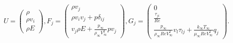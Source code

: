 \documentclass[a4paper,11pt,UTF8]{article}%
\theoremstyle{plain}
\begin{document}
$$U=\begin{pmatrix}
	\rho\\
	\rho v_i\\
	\rho E
\end{pmatrix},
F_j=\begin{pmatrix}
	\rho v_j\\
	\rho v_iv_j+p\delta_{ij}\\
	v_j\rho E+\frac{p_{\infty}}{\rho_{\infty}V_{\infty}^2}pv_j
\end{pmatrix},
G_j=\begin{pmatrix}
	0\\
	\frac{\tau_{ji}}{Re}\\
	\frac{p_{\infty}}{\rho_{\infty}ReV_{\infty}^2}v_l\tau_{lj}+\frac{k_{\infty}T_{\infty}}{\mu_{\infty}ReV_{\infty}^2}q_j
\end{pmatrix}.
$$

	
	
	
	
\end{document}
